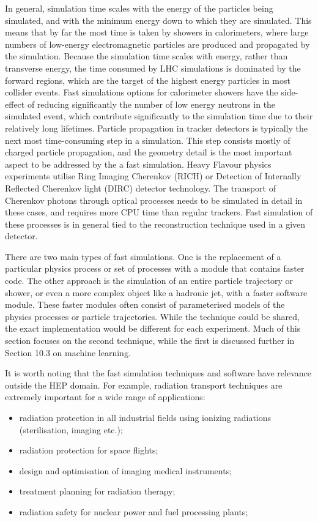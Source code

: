 \documentclass[12pt,a4paper]{article}
\begin{document}
In general, simulation time scales with the energy of the particles
being simulated, and with the minimum energy down to which they are
simulated. This means that by far the most time is taken by showers in
calorimeters, where large numbers of low-energy electromagnetic
particles are produced and propagated by the simulation. Because the
simulation time scales with energy, rather than transverse energy, the
time consumed by LHC simulations is dominated by the forward regions,
which are the target of the highest energy particles in most collider
events. Fast simulations options for calorimeter showers have the
side-effect of reducing significantly the number of low energy neutrons
in the simulated event, which contribute significantly to the simulation
time due to their relatively long lifetimes. Particle propagation in
tracker detectors is typically the next most time-consuming step in a
simulation. This step consists mostly of charged particle propagation,
and the geometry detail is the most important aspect to be addressed by
the a fast simulation. Heavy Flavour physics experiments utilise Ring
Imaging Cherenkov (RICH) or Detection of Internally Reflected Cherenkov
light (DIRC) detector technology. The transport of Cherenkov photons
through optical processes needs to be simulated in detail in these
cases, and requires more CPU time than regular trackers. Fast simulation
of these processes is in general tied to the reconstruction technique
used in a given detector.

There are two main types of fast simulations. One is the replacement of
a particular physics process or set of processes with a module that
contains faster code. The other approach is the simulation of an entire
particle trajectory or shower, or even a more complex object like a
hadronic jet, with a faster software module. These faster modules often
consist of parameterised models of the physics processes or particle
trajectories. While the technique could be shared, the exact
implementation would be different for each experiment. Much of this
section focuses on the second technique, while the first is discussed
further in Section 10.3 on machine learning.

It is worth noting that the fast simulation techniques and software have
relevance outside the HEP domain. For example, radiation transport
techniques are extremely important for a wide range of applications:

\begin{itemize}
\item
  radiation protection in all industrial fields using ionizing
  radiations (sterilisation, imaging etc.);
\item
  radiation protection for space flights;
\item
  design and optimisation of imaging medical instruments;
\item
  treatment planning for radiation therapy;
\item
  radiation safety for nuclear power and fuel processing plants;
\end{itemize}
\end{document}

